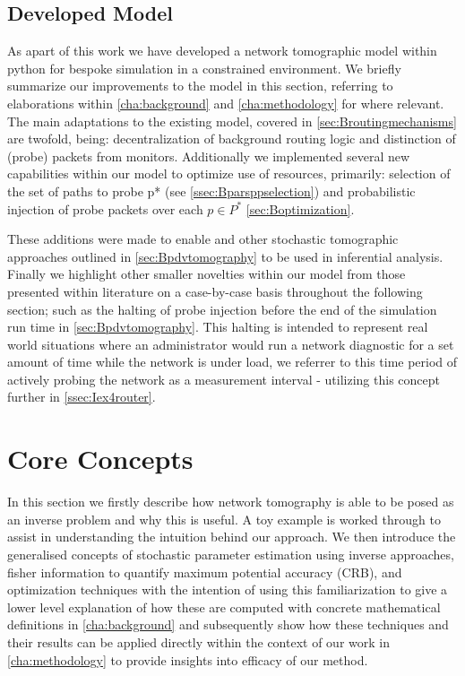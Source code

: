 \subsection{Developed Model}
\label{ssec:Idevelopedmodels}
As apart of this work we have developed a network tomographic model within python for bespoke simulation in a constrained environment. We briefly summarize our improvements to the model in this section, referring to elaborations within \cref{cha:background} and \cref{cha:methodology} for where relevant. The main adaptations to the existing model, covered in \cref{sec:Broutingmechanisms} are twofold, being: decentralization of background routing logic and distinction of (probe) packets from monitors. Additionally we implemented several new capabilities within our model to optimize use of resources, primarily: selection of the set of paths to probe \gls{p*} (see \cref{ssec:Bparsppselection}) and probabilistic injection of probe packets over each $p\in P^*$ \cref{sec:Boptimization}.\par
These additions were made to enable \pdv and other stochastic tomographic approaches outlined in \cref{sec:Bpdvtomography} to be used in inferential analysis. Finally we highlight other smaller novelties within our model from those presented within literature on a case-by-case basis throughout the following section; such as the halting of probe injection before the end of the simulation run time in \cref{sec:Bpdvtomography}. This halting is intended to represent real world situations where an administrator would run a network diagnostic for a set amount of time while the network is under load, we referrer to this time period of actively probing the network as a measurement interval - utilizing this concept further in \cref{ssec:Iex4router}.

\newpage
\section{Core Concepts}
\label{sec:Icoreconcepts}

In this section we firstly describe how network tomography is able to be posed as an inverse problem and why this is useful. A toy example is worked through to assist in understanding the intuition behind our approach. We then introduce the generalised concepts of stochastic parameter estimation using inverse approaches, fisher information to quantify maximum potential accuracy (CRB), and optimization techniques with the intention of using this familiarization to give a lower level explanation of how these are computed with concrete mathematical definitions in \cref{cha:background} and subsequently show how these techniques and their results can be applied directly within the context of our work in \cref{cha:methodology} to provide insights into efficacy of our method.

